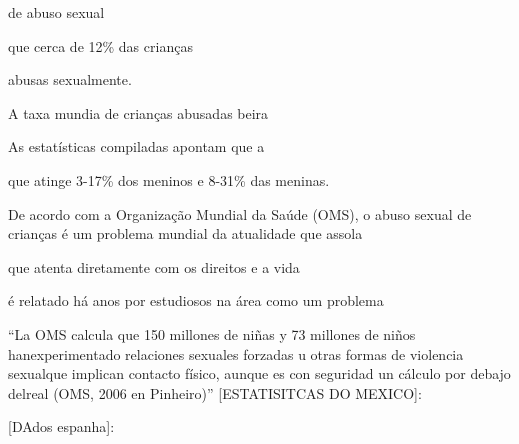 















de abuso sexual 

que cerca de 12\% das crianças 

abusas sexualmente. 

A taxa mundia de crianças abusadas beira 





As estatísticas compiladas apontam que a




que atinge 3-17\% dos meninos e 8-31\% das meninas.







De acordo com a Organização Mundial da Saúde (OMS), o abuso sexual de crianças é um problema mundial da atualidade que assola 


que atenta diretamente com os direitos e a vida 

é relatado há anos por estudiosos na área como um problema 



``La OMS calcula que 150 millones de niñas y 73 millones de niños hanexperimentado relaciones sexuales forzadas u otras formas de violencia sexualque implican contacto físico, aunque es con seguridad un cálculo por debajo delreal (OMS, 2006 en Pinheiro)''
[ESTATISITCAS DO MEXICO]: %

[DAdos espanha]: %

